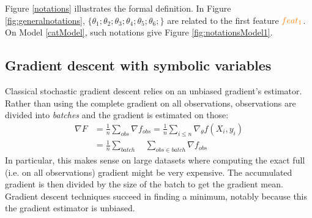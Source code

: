 Figure \ref{notations} illustrates the formal definition. In Figure \ref{fig:generalnotations}, $\{ \theta_1 ;  \theta_2 ;  \theta_3 ;  \theta_4 ;  \theta_5 ;  \theta_6 ; \}$ are related to the first feature $\textcolor{orange}{feat_1}$. On Model \ref{catModel}, such notations give Figure \ref{fig:notationsModel1}.




\subsection{Gradient descent with symbolic variables}\label{sec:motication}
Classical stochastic gradient descent relies on an unbiased gradient's estimator. Rather than using the complete gradient on all observations, observations are divided into \textit{batches} and the gradient is estimated on those:
\begin{align}
\nabla F &=  \frac{1}{n} \sum_{obs} \nabla f_{obs}  = \frac{1}{n} \sum_{i \leq n} \nabla_{\theta} f(X_i, y_i)     \\
         &= \frac{1}{n} \sum_{batch} \quad \sum_{obs \in batch} \nabla f_{obs}
\end{align}
In particular, this makes sense on large datasets where computing the exact full (i.e. on all observations) gradient might be very expensive.
The accumulated gradient is then divided by the size of the batch to get the gradient mean. Gradient descent techniques succeed in finding a minimum, notably because this the gradient estimator is unbiased. 


